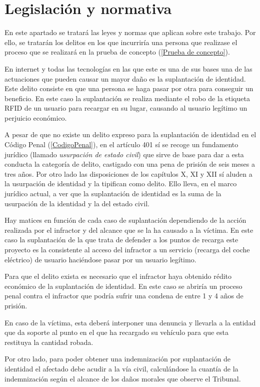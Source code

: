 \documentclass[12pt,a4paper,onecolumn,oneside]{report}
\begin{document}
\section{Legislación y normativa}

En este apartado se tratará las leyes y normas que aplican sobre este trabajo. Por ello, se tratarán los delitos en los que incurriría una persona que realizase el proceso que se realizará en la prueba de concepto (\ref{Prueba de concepto}).

En internet y todas las tecnologías en las que este es una de sus bases una de las actuaciones que pueden causar un mayor daño es la suplantación de identidad. Este delito consiste en que una persona se haga pasar por otra para conseguir un beneficio. En este caso la suplantación se realiza mediante el robo de la etiqueta RFID de un usuario para recargar en su lugar, causando al usuario legítimo un perjuicio económico.

A pesar de que no existe un delito expreso para la suplantación de identidad en el Código Penal (\ref{CodigoPenal}), en el artículo 401 sí se recoge un fundamento jurídico (llamado \textit{usurpación de estado civil}) que sirve de base para dar a esta conducta la categoría de delito, castigado con una pena de prisión de seis meses a tres años. Por otro lado las disposiciones de los capítulos X, XI y XII sí aluden a la usurpación de identidad y la tipifican como delito. Ello lleva, en el marco jurídico actual, a ver que la suplantación de identidad es la suma de la usurpación de la identidad y la del estado civil.

Hay matices en función de cada caso de suplantación dependiendo de la acción realizada por el infractor y del alcance que se la ha causado a la víctima. En este caso la suplantación de la que trata de defender a los puntos de recarga este proyecto es la consistente al acceso del infractor a un servicio (recarga del coche eléctrico) de usuario haciéndose pasar por un usuario legítimo.

Para que el delito exista es necesario que el infractor haya obtenido rédito económico de la suplantación de identidad. En este caso se abriría un proceso penal contra el infractor que podría sufrir una condena de entre 1 y 4 años de prisión.

En caso de la víctima, esta deberá interponer una denuncia y llevarla a la entidad que da soporte al punto en el que ha recargado su vehículo para que esta restituya la cantidad robada.

Por otro lado, para poder obtener una indemnización por suplantación de identidad el afectado debe acudir a la vía civil, calculándose la cuantía de la indemnización según el alcance de los daños morales que observe el Tribunal.
\end{document}
